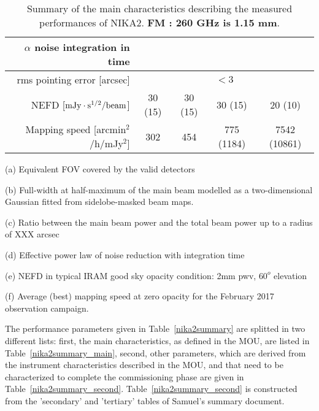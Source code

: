 \begin{table}[h]
\begin{center}
\begin{threeparttable}
\begin{tabular}{|r|c|c|c|c|}
      $\alpha$ noise integration in time\tnote{d}\hspace{1mm}  &   &   &   &  \\
      \hline
      rms pointing error    [arcsec]    & \multicolumn{4}{|c|}{$<3$}  \\
      \hline
      NEFD\tnote{e}\hspace{1mm}   [$\rm{mJy} \cdot \rm{s}^{1/2}/\rm{beam}$]  &  30 (15)   & 30 (15)  &  30 (15)  & 20 (10) \\
      Mapping speed\tnote{f}\hspace{1mm} [arcmin$^2$/h/mJy$^2$] & 302  & 454  & 775 (1184)  & 7542 (10861)  \\
\hline

\end{tabular}
  \begin{tablenotes}
{\small     
  \item[(a)] Equivalent FOV covered by the valid detectors
  \item[(b)] Full-width at half-maximum of the main beam modelled as a two-dimensional Gaussian fitted from sidelobe-masked beam maps.
  \item[(c)]  Ratio between the main beam power and the total beam power up to a radius of XXX arcsec
  \item[(d)] Effective power law of noise reduction with integration time
  \item[(e)] NEFD in typical IRAM good sky opacity condition: 2mm pwv, $60^o$ elevation
  \item[(f)] Average (best) mapping speed at zero opacity for the February 2017 observation campaign. 
}
  \end{tablenotes}
\end{threeparttable}
\caption[Main performance measurements]{Summary of the main characteristics describing the measured 
performances of NIKA2. {\bf FM : 260 GHz is 1.15 mm}.}
\label{tab:nika2summary}
\end{center}  
\end{table}


The performance parameters given in Table~\ref{nika2summary} are splitted in two different lists: first, the main characteristics, as defined in the MOU, are listed in Table~\ref{nika2summary_main}, second, other parameters, which are derived from the instrument characteristics described in the MOU, and that need to be characterized to complete the commissioning phase are given in Table~\ref{nika2summary_second}. Table~\ref{nika2summary_second} is constructed from the 'secondary' and 'tertiary' tables of Samuel's summary document. 

